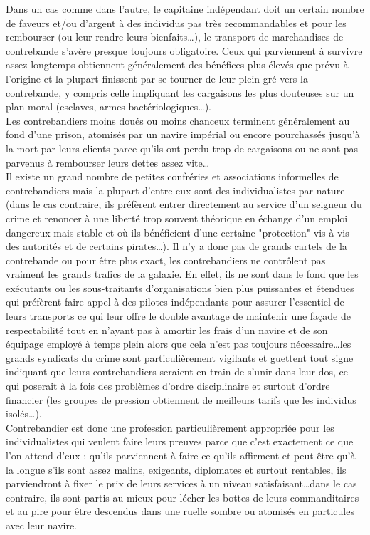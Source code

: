 \documentclass[twoside]{article}
\begin{document}
Dans un cas comme dans l'autre, le capitaine indépendant doit un certain nombre de faveurs et/ou d'argent à des individus pas très recommandables et pour les rembourser (ou leur rendre leurs bienfaits\ldots), le transport de marchandises de contrebande s'avère presque toujours obligatoire. Ceux qui parviennent à survivre assez longtemps obtiennent généralement des bénéfices plus élevés que prévu à l'origine et la plupart finissent par se tourner de leur plein gré vers la contrebande, y compris celle impliquant les cargaisons les plus douteuses sur un plan moral (esclaves, armes bactériologiques\ldots).\\

Les contrebandiers moins doués ou moins chanceux terminent généralement au fond d'une prison, atomisés par un navire impérial ou encore pourchassés jusqu'à la mort par leurs clients parce qu'ils ont perdu trop de cargaisons ou ne sont pas parvenus à rembourser leurs dettes assez vite\ldots\\

Il existe un grand nombre de petites confréries et associations informelles de contrebandiers mais la plupart d'entre eux sont des individualistes par nature (dans le cas contraire, ils préfèrent entrer directement au service d'un seigneur du crime et renoncer à une liberté trop souvent théorique en échange d'un emploi dangereux mais stable et où ils bénéficient d'une certaine "protection" vis à vis des autorités et de certains pirates\ldots). Il n'y  a donc pas de grands cartels de la contrebande ou pour être plus exact, les contrebandiers ne contrôlent pas vraiment les grands trafics de la galaxie. En effet, ils ne sont dans le fond que les exécutants ou les sous-traitants d'organisations bien plus puissantes et étendues qui préfèrent faire appel à des pilotes indépendants pour assurer l'essentiel de leurs transports ce qui leur offre le double avantage de maintenir une façade de respectabilité tout en n'ayant pas à amortir les frais d'un navire et de son équipage employé à temps plein alors que cela n'est pas toujours nécessaire\ldots les grands syndicats du crime sont particulièrement vigilants et guettent tout signe indiquant que leurs contrebandiers seraient en train de s'unir dans leur dos, ce qui poserait à la fois des problèmes d'ordre disciplinaire et surtout d'ordre financier (les groupes de pression obtiennent de meilleurs tarifs que les individus isolés\ldots).\\

Contrebandier est donc une profession particulièrement appropriée pour les individualistes qui veulent faire leurs preuves parce que c'est exactement ce que l'on attend d'eux : qu'ils parviennent à faire ce qu'ils affirment et peut-être qu'à la longue s'ils sont assez malins, exigeants, diplomates et surtout rentables, ils parviendront à fixer le prix de leurs services à un niveau satisfaisant\ldots dans le cas contraire, ils sont partis au mieux pour lécher les bottes de leurs commanditaires et au pire pour être descendus dans une ruelle sombre ou atomisés en particules avec leur navire.\\
\end{document}
